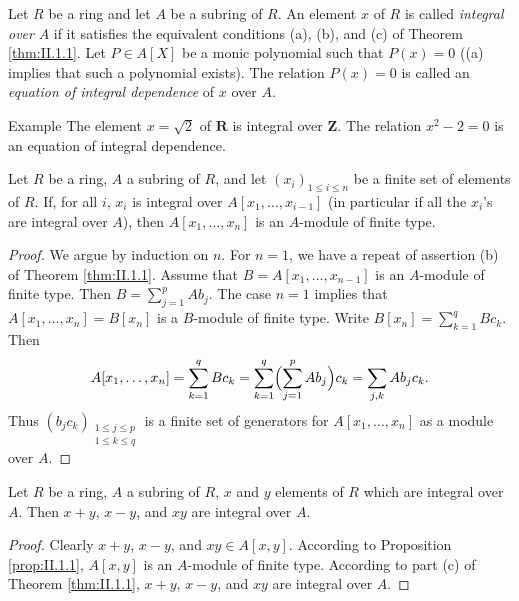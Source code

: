 \begin{definition}\label{def:II.1.1}
Let $R$ be a ring and let $A$ be a subring of $R$. An element $x$ of $R$ is
called \emph{integral over} $A$ if it satisfies the equivalent conditions
(a), (b), and (c) of Theorem \ref{thm:II.1.1}. Let $P\in A[X]$ be a monic
polynomial such that $P(x)=0$ ((a) implies that such a polynomial exists).
The relation $P(x)=0$ is called an \emph{equation of integral dependence} of
$x$ over $A$.
\end{definition}

\begin{statement}{Example}
The element $x=\sqrt{2}$ of $\mathbf{R}$ is integral over $\mathbf{Z}$. The
relation $x^{2}-2=0$ is an equation of integral dependence.
\end{statement}

\begin{proposition}
\label{prop:II.1.1}
Let $R$ be a ring, $A$ a subring of $R$, and let $(x_{i})_{1\leq i\leq n}$ be
a finite set of elements of $R$. If, for all $i$, $x_{i}$ is integral over
$A[x_{1},\ldots,x_{i-1}]$ (in particular if all the $x_{i}$'s are integral
over $A$), then $A[x_{1},\ldots,x_{n}]$ is an $A$-module of finite type.
\end{proposition}

\begin{proof}
We argue by induction on $n$. For $n=1$, we have a repeat of assertion (b)
of Theorem \ref{thm:II.1.1}. Assume that $B=A[x_{1},\ldots,x_{n-1}]$ is an
$A$-module of finite type. Then $B=\sum_{j=1}^{p}Ab_{j}$. The case $n=1$
implies that $A[x_{1},\ldots,x_{n}]=B[x_{n}]$ is a $B$-module of finite
type. Write $B[x_{n}]=\sum_{k=1}^{q}Bc_{k}$. Then
\[
A[x_{1},\ldots,x_{n}]=\sum_{k=1}^{q}Bc_{k}
=\sum_{k=1}^{q}\Bigl(\sum_{j=1}^{p}Ab_{j}\Bigr)c_{k}
=\sum_{j,k}Ab_{j}c_{k}.
\]
Thus $(b_{j}c_{k})_{\substack{1\leq j\leq p\\1\leq k\leq q}}$ is a finite
set of generators for $A[x_{1},\ldots,x_{n}]$ as a module over $A$.
\end{proof}

\begin{corollary}
\label{cor:II.1.1}
Let $R$ be a ring, $A$ a subring of $R$, $x$ and $y$ elements of $R$ which
are integral over $A$. Then $x+y$, $x-y$, and $xy$ are integral over $A$.
\end{corollary}

\begin{proof}
Clearly $x+y$, $x-y$, and $xy\in A[x,y]$. According to Proposition
\ref{prop:II.1.1}, $A[x,y]$ is an $A$-module of finite type. According to
part (c) of Theorem \ref{thm:II.1.1}, $x+y$, $x-y$, and $xy$ are integral
over $A$.
\end{proof}

